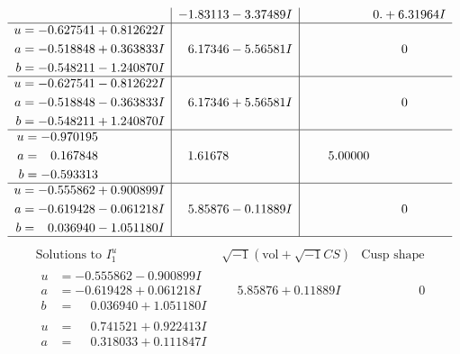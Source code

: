 \documentclass[1p]{elsarticle_modified}
\theoremstyle{definition}
\newcommand{\I}{\sqrt{-1}}
\begin{document}
$$\begin{array}{c|c|c}
 & -1.83113 - 3.37489 I & \phantom{-0.000000 -}0. + 6.31964 I \\ \hline\begin{aligned}
u &= -0.627541 + 0.812622 I \\
a &= -0.518848 + 0.363833 I \\
b &= -0.548211 - 1.240870 I\end{aligned}
 & \phantom{-}6.17346 - 5.56581 I & \phantom{-0.000000 } 0 \\ \hline\begin{aligned}
u &= -0.627541 - 0.812622 I \\
a &= -0.518848 - 0.363833 I \\
b &= -0.548211 + 1.240870 I\end{aligned}
 & \phantom{-}6.17346 + 5.56581 I & \phantom{-0.000000 } 0 \\ \hline\begin{aligned}
u &= -0.970195\phantom{ +0.000000I} \\
a &= \phantom{-}0.167848\phantom{ +0.000000I} \\
b &= -0.593313\phantom{ +0.000000I}\end{aligned}
 & \phantom{-}1.61678\phantom{ +0.000000I} & \phantom{-}5.00000\phantom{ +0.000000I} \\ \hline\begin{aligned}
u &= -0.555862 + 0.900899 I \\
a &= -0.619428 - 0.061218 I \\
b &= \phantom{-}0.036940 - 1.051180 I\end{aligned}
 & \phantom{-}5.85876 - 0.11889 I & \phantom{-0.000000 } 0\\
 \hline 
 \end{array}$$\newpage$$\begin{array}{c|c|c}  
\text{Solutions to }I^u_{1}& \I (\text{vol} + \sqrt{-1}CS) & \text{Cusp shape}\\
 \hline 
\begin{aligned}
u &= -0.555862 - 0.900899 I \\
a &= -0.619428 + 0.061218 I \\
b &= \phantom{-}0.036940 + 1.051180 I\end{aligned}
 & \phantom{-}5.85876 + 0.11889 I & \phantom{-0.000000 } 0 \\ \hline\begin{aligned}
u &= \phantom{-}0.741521 + 0.922413 I \\
a &= \phantom{-}0.318033 + 0.111847 I \\

\end{aligned}
\end{array}$$
\end{document}
